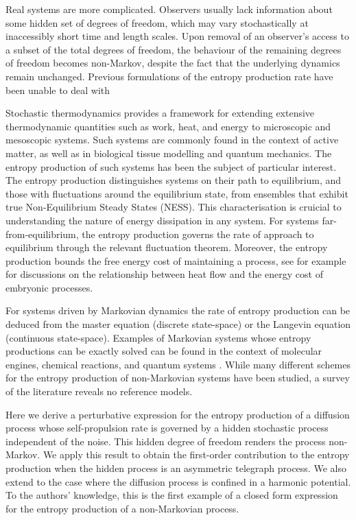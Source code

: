 \documentclass[%
 amsmath,amssymb,
]{revtex4-2}
\begin{document}
Real systems are more complicated. Observers usually lack information about some hidden set of degrees of freedom, which may vary stochastically at inaccessibly short time and length scales. Upon removal of an observer's access to a subset of the total degrees of freedom, the behaviour of the remaining degrees of freedom becomes non-Markov, despite the fact that the underlying dynamics remain unchanged. Previous formulations of the entropy production rate have been unable to deal with



Stochastic thermodynamics provides a framework for extending extensive thermodynamic quantities such as work, heat, and energy to  microscopic and mesoscopic systems. Such systems are commonly found in the context of active matter, as well as in biological tissue modelling and quantum mechanics. The entropy production of such systems has been the subject of particular interest. The entropy production distinguishes systems on their path to equilibrium, and those with fluctuations around the equilibrium state, from ensembles that exhibit true Non-Equilibrium Steady States (NESS).   This characterisation is cruicial to understanding the nature of energy dissipation in any system. For systems far-from-equilibrium, the entropy production governs the rate of approach to equilibrium through the relevant fluctuation theorem. Moreover, the entropy production bounds the free energy cost of maintaining a process, see for example \cite{SONG2019R566,RODENFELS2019646} for discussions on the relationship between heat flow and the energy cost of embryonic processes.

For systems driven by Markovian dynamics the rate of entropy production can be deduced from the master equation (discrete state-space) or the Langevin equation (continuous state-space). Examples of Markovian systems whose entropy productions can be exactly solved can be found in the context of molecular engines, chemical reactions, and quantum systems \cite{Bio-uncertainty-relation}.  While many different schemes for the entropy production of non-Markovian systems have been studied, a survey of the literature reveals no reference models.

Here we derive a perturbative expression for the entropy production of a diffusion process whose self-propulsion rate is governed by a hidden stochastic process independent of the noise.  This hidden degree of freedom renders the process non-Markov.  We apply this result to obtain the first-order contribution to the entropy production when the hidden process is an asymmetric telegraph process. We also extend to the case where the diffusion process is confined in a harmonic potential. To the authors' knowledge, this is the first example of a closed form expression for the entropy production of a non-Markovian process.
\end{document}
